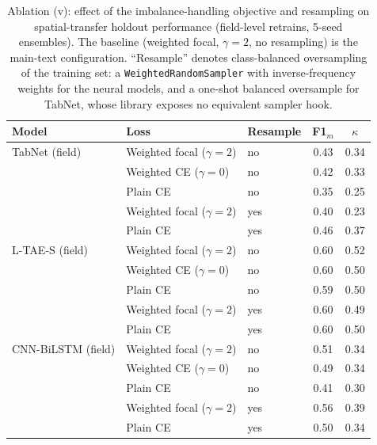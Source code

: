 \documentclass[pdflatex,sn-mathphys]{sn-jnl} %
\begin{document}
\begin{table}[htbp]
\centering
\scriptsize
\caption{Ablation (v): effect of the imbalance-handling objective and resampling
on spatial-transfer holdout performance (field-level retrains, 5-seed ensembles).
The baseline (weighted focal, $\gamma{=}2$, no resampling) is the main-text
configuration. ``Resample'' denotes class-balanced oversampling of the training
set: a \texttt{WeightedRandomSampler} with inverse-frequency weights for the
neural models, and a one-shot balanced oversample for TabNet, whose library
exposes no equivalent sampler hook.}
\label{tab:abl_loss}
\renewcommand{\arraystretch}{1.12}
\setlength{\tabcolsep}{8pt}
\begin{tabular}{lllcc}
\toprule
\textbf{Model} & \textbf{Loss} & \textbf{Resample} & \textbf{F1$_m$} & \textbf{$\kappa$} \\
\midrule
TabNet (field)     & Weighted focal ($\gamma{=}2$) & no  & 0.43 & 0.34 \\
                   & Weighted CE ($\gamma{=}0$)    & no  & 0.42 & 0.33 \\
                   & Plain CE                       & no  & 0.35 & 0.25 \\
                   & Weighted focal ($\gamma{=}2$) & yes & 0.40 & 0.23 \\
                   & Plain CE                       & yes & 0.46 & 0.37 \\
\midrule
L-TAE-S (field)    & Weighted focal ($\gamma{=}2$) & no  & 0.60 & 0.52 \\
                   & Weighted CE ($\gamma{=}0$)    & no  & 0.60 & 0.50 \\
                   & Plain CE                       & no  & 0.59 & 0.50 \\
                   & Weighted focal ($\gamma{=}2$) & yes & 0.60 & 0.49 \\
                   & Plain CE                       & yes & 0.60 & 0.50 \\
\midrule
CNN-BiLSTM (field) & Weighted focal ($\gamma{=}2$) & no  & 0.51 & 0.34 \\
                   & Weighted CE ($\gamma{=}0$)    & no  & 0.49 & 0.34 \\
                   & Plain CE                       & no  & 0.41 & 0.30 \\
                   & Weighted focal ($\gamma{=}2$) & yes & 0.56 & 0.39 \\
                   & Plain CE                       & yes & 0.50 & 0.34 \\
\bottomrule
\end{tabular}
\end{table}
\end{document}
